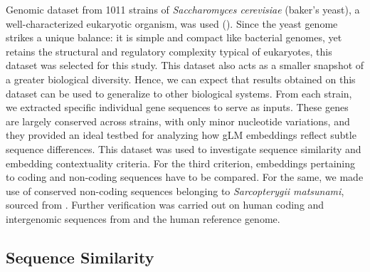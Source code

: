 \documentclass{ifacconf}
\begin{document}
Genomic dataset from 1011 strains of \textit{Saccharomyces cerevisiae} (baker’s yeast), a well-characterized eukaryotic organism, was used (\cite{Peter2018}). Since the yeast genome strikes a unique balance: it is simple and compact like bacterial genomes, yet retains the structural and regulatory complexity typical of eukaryotes, this dataset was selected for this study. This dataset also acts as a smaller snapshot of a greater biological diversity. Hence, we can expect that results obtained on this dataset can be used to generalize to other biological systems. From each strain, we extracted specific individual gene sequences to serve as inputs. These genes are largely conserved across strains, with only minor nucleotide variations, and they provided an ideal testbed for analyzing how gLM embeddings reflect subtle sequence differences. This dataset was used to investigate sequence similarity and embedding contextuality criteria. For the third criterion, embeddings pertaining to coding and non-coding sequences have to be compared. For the same, we made use of conserved non-coding sequences belonging to \textit{Sarcopterygii matsunami}, sourced from \cite{Inoue2021}. Further verification was carried out on human coding and intergenomic sequences from \cite{Gresova2022} and the human reference genome.



\vskip -1cm
\subsection{Sequence Similarity}

\end{document}
